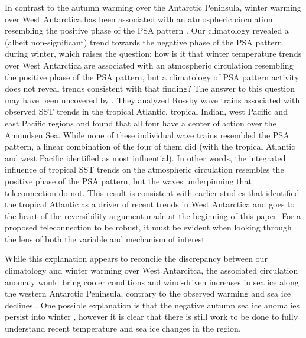 In contrast to the autumn warming over the Antarctic Peninsula, winter warming over West Antarctica has been associated with an atmospheric circulation resembling the positive phase of the PSA pattern \citep{Ding2011}. Our climatology revealed a (albeit non-significant) trend towards the negative phase of the PSA pattern during winter, which raises the question: how is it that winter temperature trends over West Antarctica are associated with an atmospheric circulation resembling the positive phase of the PSA pattern, but a climatology of PSA pattern activity does not reveal trends consistent with that finding? The answer to this question may have been uncovered by \citet{Li2015a}. They analyzed Rossby wave trains associated with observed SST trends in the tropical Atlantic, tropical Indian, west Pacific and east Pacific regions and found that all four have a center of action over the Amundsen Sea. While none of these individual wave trains resembled the PSA pattern, a linear combination of the four of them did (with the tropical Atlantic and west Pacific identified as most influential). In other words, the integrated influence of tropical SST trends on the atmospheric circulation resembles the positive phase of the PSA pattern, but the waves underpinning that teleconnection do not. This result is consistent with earlier studies that identified the tropical Atlantic as a driver of recent trends in West Antarctica \citep{Li2014,Simpkins2014} and goes to the heart of the reversibility argument made at the beginning of this paper. For a proposed teleconnection to be robust, it must be evident when looking through the lens of both the variable and mechanism of interest.

While this explanation appears to reconcile the discrepancy between our climatology and winter warming over West Antarcitca, the associated circulation anomaly would bring cooler conditions and wind-driven increases in sea ice along the western Antarctic Peninsula, contrary to the observed warming and sea ice declines \citep{Clem2015}. One possible explanation is that the negative autumn sea ice anomalies persist into winter \citet{Ding2013}, however it is clear that there is still work to be done to fully understand recent temperature and sea ice changes in the region.

